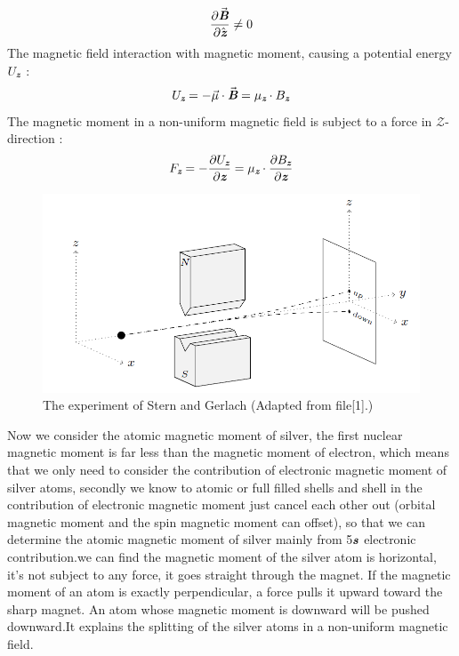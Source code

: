 \documentclass[a4paper]{article}
\def\mathbi#1{\textbf{\em #1}}
\begin{document}
\begin{equation}  
\frac{\partial\vec{\mathbi{B}}}{\partial\hat{\textbf{$\mathbi{z}$}}}\neq  0
\end{equation}
The magnetic field interaction with magnetic moment, causing a potential energy $\textbf{$U_{\mathbi{z}}$}$ :
\begin{equation}
\textbf{$U_{\mathbi{z}}$}=-\vec{\mu}
\cdot\vec{\mathbi{B}}=\textbf{$\mu_{\mathbi{z}}$}
\cdot\textbf{$B_{\mathbi{z}}$}
\end{equation}
The magnetic moment in a non-uniform magnetic field is subject to a force in $\mathcal{Z}$-direction :
\begin{equation}
\textbf{$F_{\mathbi{z}}$}=-\frac{\partial\textbf{$U_{\mathbi{z}}$}}{\partial\textbf{$\mathbi{z}$}}=\textbf{$\mu_{\mathbi{z}}$}
\cdot\frac{\partial\textbf{$B_{\mathbi{z}}$}}{\partial\textbf{$\mathbi{z}$}}
\end{equation}
\begin{figure}[htbp!] \label{figure}
\centering %
    \includegraphics[width=0.8\linewidth]{22.jpg}
    \caption{The experiment of Stern and Gerlach (Adapted from file[1].)}
\end{figure}



Now we consider the atomic magnetic moment of silver, the first nuclear magnetic moment is far less than the magnetic moment of electron, which means that we only need to consider the contribution of electronic magnetic moment of silver atoms, secondly we know to atomic or full filled shells and shell in the contribution of electronic magnetic moment just cancel each other out (orbital magnetic moment and the spin magnetic moment can offset), so that we can determine the atomic magnetic moment of silver mainly from 5$\mathbi{s}$ electronic contribution.we can find the magnetic moment of the silver atom is horizontal, it's not subject to any force, it goes straight through the magnet. If the magnetic moment of an atom is exactly perpendicular, a force pulls it upward toward the sharp magnet. An atom whose magnetic moment is downward will be pushed downward.It
 explains the splitting of the silver atoms in a non-uniform magnetic field\cite{arazo2016stern}.
\end{document}
